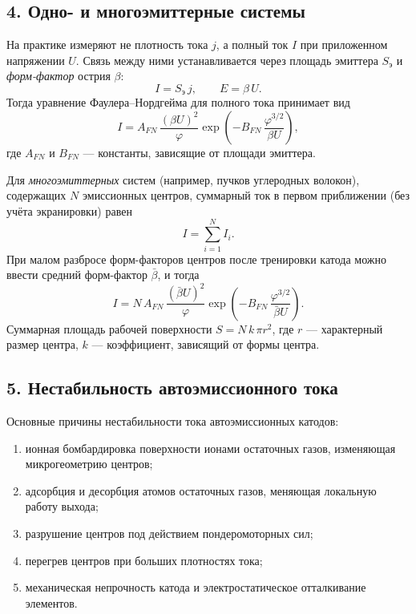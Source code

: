 \documentclass[12pt, a4paper]{article}
\begin{document}
\subsection*{4. Одно- и многоэмиттерные системы}

На практике измеряют не плотность тока $j$, а полный ток $I$ при приложенном напряжении $U$. Связь между ними устанавливается через площадь эмиттера $S_{\text{э}}$ и \textit{форм-фактор} острия $\beta$:
\begin{equation}
    I = S_{\text{э}}\,j, \qquad E = \beta\,U.
\end{equation}
Тогда уравнение Фаулера--Нордгейма для полного тока принимает вид
\begin{equation}
    I = A_{FN}\,\frac{(\beta U)^{2}}{\varphi}\exp\!\left(-B_{FN}\,\frac{\varphi^{3/2}}{\beta U}\right),
    \label{eq:FN_IU}
\end{equation}
где $A_{FN}$ и $B_{FN}$ --- константы, зависящие от площади эмиттера.

Для \textit{многоэмиттерных} систем (например, пучков углеродных волокон), содержащих $N$ эмиссионных центров, суммарный ток в первом приближении (без учёта экранировки) равен
\begin{equation}
    I = \sum_{i=1}^{N} I_{i}.
\end{equation}
При малом разбросе форм-факторов центров после тренировки катода можно ввести средний форм-фактор $\bar\beta$, и тогда
\begin{equation}
    I = N\,A_{FN}\,\frac{(\bar\beta U)^{2}}{\varphi}\exp\!\left(-B_{FN}\,\frac{\varphi^{3/2}}{\bar\beta U}\right).
    \label{eq:FN_multi}
\end{equation}
Суммарная площадь рабочей поверхности $S = N\,k\,\pi r^{2}$, где $r$ --- характерный размер центра, $k$ --- коэффициент, зависящий от формы центра.

\subsection*{5. Нестабильность автоэмиссионного тока}

Основные причины нестабильности тока автоэмиссионных катодов:
\begin{enumerate}
    \item ионная бомбардировка поверхности ионами остаточных газов, изменяющая микрогеометрию центров;
    \item адсорбция и десорбция атомов остаточных газов, меняющая локальную работу выхода;
    \item разрушение центров под действием пондеромоторных сил;
    \item перегрев центров при больших плотностях тока;
    \item механическая непрочность катода и электростатическое отталкивание элементов.
\end{enumerate}
\end{document}
